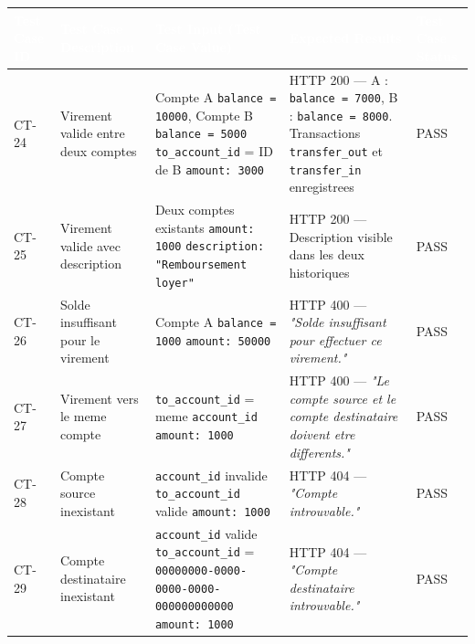\documentclass[12pt,a4paper]{article}
\begin{document}
\begin{longtable}{|L{1.6cm}|L{3.8cm}|L{5.2cm}|L{4.2cm}|L{1.8cm}|}
\hline
{}
\textbf{\textcolor{white}{Test Case ID}} & \textbf{\textcolor{white}{Test Case Description}} & \textbf{\textcolor{white}{Test Input (Test Case Value)}} & \textbf{\textcolor{white}{Expected Results}} & \textbf{\textcolor{white}{Test Case Status}} \\
\hline
CT-24 & Virement valide entre deux comptes & Compte A \texttt{balance = 10000}, Compte B \texttt{balance = 5000} \newline \texttt{to\_account\_id} = ID de B \newline \texttt{amount: 3000} & HTTP 200 --- A : \texttt{balance = 7000}, B : \texttt{balance = 8000}. Transactions \texttt{transfer\_out} et \texttt{transfer\_in} enregistrees & PASS \\
\hline
{}
CT-25 & Virement valide avec description & Deux comptes existants \newline \texttt{amount: 1000} \newline \texttt{description: "Remboursement loyer"} & HTTP 200 --- Description visible dans les deux historiques & PASS \\
\hline
CT-26 & Solde insuffisant pour le virement & Compte A \texttt{balance = 1000} \newline \texttt{amount: 50000} & HTTP 400 --- \textit{"Solde insuffisant pour effectuer ce virement."} & PASS \\
\hline
{}
CT-27 & Virement vers le meme compte & \texttt{to\_account\_id} = meme \texttt{account\_id} \newline \texttt{amount: 1000} & HTTP 400 --- \textit{"Le compte source et le compte destinataire doivent etre differents."} & PASS \\
\hline
CT-28 & Compte source inexistant & \texttt{account\_id} invalide \newline \texttt{to\_account\_id} valide \newline \texttt{amount: 1000} & HTTP 404 --- \textit{"Compte introuvable."} & PASS \\
\hline
{}
CT-29 & Compte destinataire inexistant & \texttt{account\_id} valide \newline \texttt{to\_account\_id} = \texttt{00000000-0000-0000-0000-000000000000} \newline \texttt{amount: 1000} & HTTP 404 --- \textit{"Compte destinataire introuvable."} & PASS \\
\hline
\end{longtable}
\end{document}
